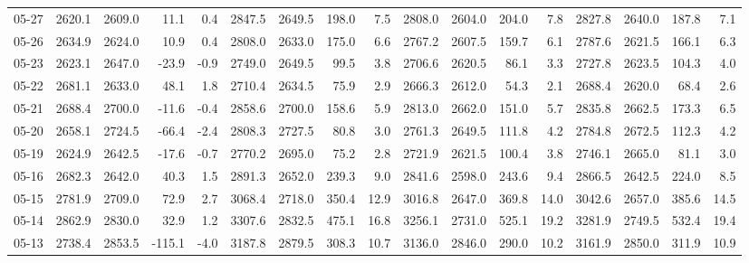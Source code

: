 \begin{threeparttable}
{\begin{tabular}{lrrrrrrrrrrrrrrrr}
  05-27 & 2620.1 & 2609.0 &       11.1 &            0.4 & 2847.5 & 2649.5 &      198.0 &            7.5 & 2808.0 & 2604.0 &      204.0 &            7.8 & 2827.8 & 2640.0 &       187.8 &              7.1 \\
  05-26 & 2634.9 & 2624.0 &       10.9 &            0.4 & 2808.0 & 2633.0 &      175.0 &            6.6 & 2767.2 & 2607.5 &      159.7 &            6.1 & 2787.6 & 2621.5 &       166.1 &              6.3 \\
  05-23 & 2623.1 & 2647.0 &      -23.9 &           -0.9 & 2749.0 & 2649.5 &       99.5 &            3.8 & 2706.6 & 2620.5 &       86.1 &            3.3 & 2727.8 & 2623.5 &       104.3 &              4.0 \\
  05-22 & 2681.1 & 2633.0 &       48.1 &            1.8 & 2710.4 & 2634.5 &       75.9 &            2.9 & 2666.3 & 2612.0 &       54.3 &            2.1 & 2688.4 & 2620.0 &        68.4 &              2.6 \\
  05-21 & 2688.4 & 2700.0 &      -11.6 &           -0.4 & 2858.6 & 2700.0 &      158.6 &            5.9 & 2813.0 & 2662.0 &      151.0 &            5.7 & 2835.8 & 2662.5 &       173.3 &              6.5 \\
  05-20 & 2658.1 & 2724.5 &      -66.4 &           -2.4 & 2808.3 & 2727.5 &       80.8 &            3.0 & 2761.3 & 2649.5 &      111.8 &            4.2 & 2784.8 & 2672.5 &       112.3 &              4.2 \\
  05-19 & 2624.9 & 2642.5 &      -17.6 &           -0.7 & 2770.2 & 2695.0 &       75.2 &            2.8 & 2721.9 & 2621.5 &      100.4 &            3.8 & 2746.1 & 2665.0 &        81.1 &              3.0 \\
  05-16 & 2682.3 & 2642.0 &       40.3 &            1.5 & 2891.3 & 2652.0 &      239.3 &            9.0 & 2841.6 & 2598.0 &      243.6 &            9.4 & 2866.5 & 2642.5 &       224.0 &              8.5 \\
  05-15 & 2781.9 & 2709.0 &       72.9 &            2.7 & 3068.4 & 2718.0 &      350.4 &           12.9 & 3016.8 & 2647.0 &      369.8 &           14.0 & 3042.6 & 2657.0 &       385.6 &             14.5 \\
  05-14 & 2862.9 & 2830.0 &       32.9 &            1.2 & 3307.6 & 2832.5 &      475.1 &           16.8 & 3256.1 & 2731.0 &      525.1 &           19.2 & 3281.9 & 2749.5 &       532.4 &             19.4 \\
  05-13 & 2738.4 & 2853.5 &     -115.1 &           -4.0 & 3187.8 & 2879.5 &      308.3 &           10.7 & 3136.0 & 2846.0 &      290.0 &           10.2 & 3161.9 & 2850.0 &       311.9 &             10.9 \\

\end{tabular}}
\end{threeparttable}
